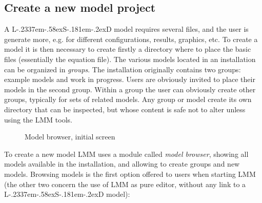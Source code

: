 \documentclass [11pt,a4paper] {book}
\def\LsD{{L\kern-.2337em\lower-.58ex\hbox{S}\kern-.181em\lower-.2ex\hbox{D}}\xspace}
\begin{document}
\subsection{Create a new model project}
A \LsD model requires several files, and the user is generate more, e.g. for different configurations, results, graphics, etc. To create a model it is then necessary to create firstly a directory where to place the basic files (essentially the equation file). The various models located in an installation can be organized in \textit{groups}. The installation originally contains two groups: example models and work in progress. Users are obviously invited to place their models in the second group. Within a group the user can obviously create other groups, typically for sets of related models. Any group or model create its own directory that can be inspected, but whose content is safe not to alter unless using the LMM tools.

\begin{figure}[ht]
  \centering
  \caption{Model browser, initial screen}
  \label{fig:modelbrowser1}
\end{figure}

To create a new model LMM uses a module called \textit{model browser}, showing all models available in the installation, and allowing to create groups and new models. Browsing models is the first option offered to users when starting LMM (the other two concern the use of LMM as pure editor, without any link to a \LsD model):
\end{document}

